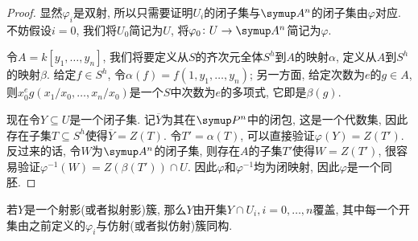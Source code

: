 \begin{proof}
    显然$\varphi_i$是双射, 所以只需要证明$U_i$的闭子集与$\An$的闭子集由$\varphi$对应. 不妨假设$i=0$, 我们将$U_0$简记为$U$, 将$\varphi_0\colon U\to \An$简记为$\varphi$.

    令$A = k[y_1, \dotsc, y_n]$, 我们将要定义从$S$的齐次元全体$S^h$到$A$的映射$\alpha$, 定义从$A$到$S^h$的映射$\beta$. 给定$f\in S^h$, 令$\alpha(f)=f(1, y_1, \dotsc, y_n)$; 另一方面, 给定次数为$e$的$g\in A$, 则$x_0^eg(x_1/x_0, \dotsc, x_n/x_0)$是一个$S$中次数为$e$的多项式, 它即是$\beta(g)$.

    现在令$Y\subseteq U$是一个闭子集. 记$\overline{Y}$为其在$\Pn$中的闭包, 这是一个代数集, 因此存在子集$T\subseteq S^h$使得$\overline{Y}=Z(T)$. 令$T'=\alpha(T)$, 可以直接验证$\varphi(Y)=Z(T')$. 反过来的话, 令$W$为$\An$的闭子集, 则存在$A$的子集$T'$使得$W=Z(T')$, 很容易验证$\varphi^{-1}(W) = Z(\beta(T'))\cap U$. 因此$\varphi$和$\varphi^{-1}$均为闭映射, 因此$\varphi$是一个同胚.
\end{proof}

\begin{corollary}
    若$Y$是一个射影(或者拟射影)簇, 那么$Y$由开集$Y\cap U_i, i=0, \dotsc, n$覆盖, 其中每一个开集由之前定义的$\varphi_i$与仿射(或者拟仿射)簇同构.
\end{corollary}

